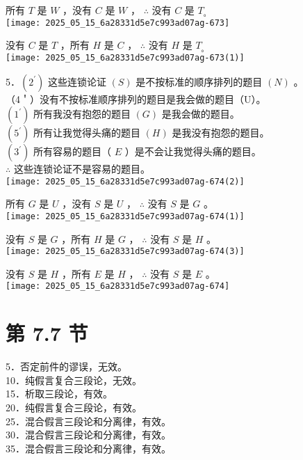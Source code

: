 所有 $T$ 是 $W$ ，没有 $C$ 是 $W$ ， $\therefore$ 没有 $C$ 是 $T_{\text {。 }}$\\
\texttt{[image: 2025\_05\_15\_6a28331d5e7c993ad07ag-673]}

没有 $C$ 是 $T$ ，所有 $H$ 是 $C$ ， $\therefore$ 没有 $H$ 是 $T_{\text {。 }}$\\
\texttt{[image: 2025\_05\_15\_6a28331d5e7c993ad07ag-673(1)]}

5．$\left(2^{\prime}\right)$ 这些连锁论证 $(S)$ 是不按标准的顺序排列的题目 $(N)$ 。\\
（4＇）没有不按标准顺序排列的题目是我会做的题目（U）。\\
$\left(1^{\prime}\right)$ 所有我没有抱怨的题目 $(G)$ 是我会做的题目。\\
$\left(5^{\prime}\right)$ 所有让我觉得头痛的题目 $(H)$ 是我没有抱怨的题目。\\
$\left(3^{\prime}\right)$ 所有容易的题目（ $E$ ）是不会让我觉得头痛的题目。\\
$\therefore$ 这些连锁论证不是容易的题目。\\
\texttt{[image: 2025\_05\_15\_6a28331d5e7c993ad07ag-674(2)]}

所有 $G$ 是 $U$ ，没有 $S$ 是 $U$ ， $\therefore$ 没有 $S$ 是 $G$ 。\\
\texttt{[image: 2025\_05\_15\_6a28331d5e7c993ad07ag-674(1)]}

没有 $S$ 是 $G$ ，所有 $H$ 是 $G$ ， $\therefore$ 没有 $S$ 是 $H$ 。\\
\texttt{[image: 2025\_05\_15\_6a28331d5e7c993ad07ag-674(3)]}

没有 $S$ 是 $H$ ，所有 $E$ 是 $H$ ， $\therefore$ 没有 $S$ 是 $E$ 。\\
\texttt{[image: 2025\_05\_15\_6a28331d5e7c993ad07ag-674]}

\section*{第 7.7 节}
5．否定前件的谬误，无效。\\
10．纯假言复合三段论，无效。\\
15．析取三段论，有效。\\
20．纯假言复合三段论，有效。\\
25．混合假言三段论和分离律，有效。\\
30．混合假言三段论和分离律，有效。\\
35．混合假言三段论和分离律，有效。

